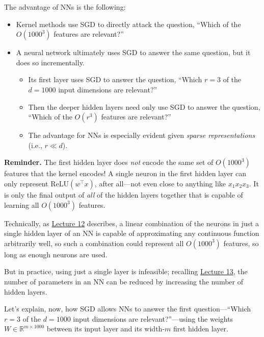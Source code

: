 The advantage of NNs is the following:
\begin{itemize}
    \item Kernel methods use SGD to directly attack the question,
    ``Which of the $O(1000^3)$ features are relevant?''
    \item A neural network ultimately uses SGD to answer the same question,
    but it does so incrementally.
    \begin{itemize}
        \item Its first layer uses SGD to answer the question,
        ``Which $r = 3$ of the $d = 1000$ input dimensions are relevant?''
        \item Then the deeper hidden layers need only
        use SGD to answer the question,
        ``Which of the $O(r^3)$ features are relevant?''
        \item The advantage for NNs is especially evident
        given \emph{sparse representations} (i.e., $r \ll d$).
    \end{itemize}
\end{itemize}

\textbf{Reminder.} The first hidden layer does \emph{not} encode
the same set of $O(1000^3)$ features that the kernel encodes!
A single neuron in the first hidden layer
can only represent $\mathrm{ReLU}(w^{\top}x)$, after all---not
even close to anything like $x_1x_2x_3$.
It is only the final output of \emph{all} of the hidden layers together
that is capable of learning all $O(1000^3)$ features.

\begin{remark}
    Technically, as
    \href{/6.790/lectures/12/#neural-network-universal-approximation}{Lecture 12}
    describes, a linear combination of
    the neurons in just a single hidden layer of an NN
    is capable of approximating any continuous function arbitrarily well,
    so such a combination could represent all $O(1000^3)$ features,
    so long as enough neurons are used.

    But in practice, using just a single layer is infeasible;
    recalling \href{/6.790/lectures/13/#neural-network-depth}{Lecture 13},
    the number of parameters in an NN can be reduced
    by increasing the number of hidden layers.
\end{remark}

Let's explain, now, how SGD allows NNs
to answer the first question---``Which $r = 3$
of the $d = 1000$ input dimensions are relevant?''---using
the weights $W \in \mathbb{R}^{m \times 1000}$
between its input layer and its width-$m$ first hidden layer.

